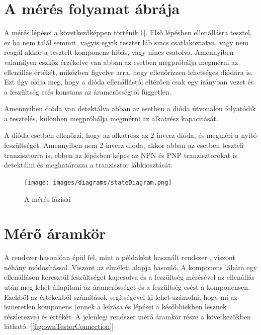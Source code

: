\section{A mérés folyamat ábrája}

A mérés lépései a következőképpen történik[\ref{fig:CalculateStateDiagram}].
Első lépésben ellenállásra tesztel, ez ha nem talál semmit,
vagyis egyik teszter láb sincs csatlakoztatva, vagy nem reagál akkor 
a tesztelt komponens hibás, vagy nincs csatolva. Amennyiben valamilyen 
eszköz érzékelve van abban az esetben megpróbálja megmérni az ellenállás 
értékét, miközben figyelve arra, hogy ellenőrizzen lehetséges diódára is.
Ezt úgy oldja meg, hogy a dióda ellenállástól eltérően csak egy irányban vezet és
a feszültség esés konstans az áramerősségtől független.

Amennyiben dióda van detektálva abban az esetben a dióda útvonalon folyatódik a
tesztelés, különben megpróbálja megmérni az alkatrész kapacitását.

A dióda esetben ellenőrzi, hogy az alkatrész az 2 inverz dióda, és 
megméri a nyitó feszültségét. Amennyiben nem 2 inverz dióda, akkor abban az esetben
teszteli tranzisztorra is, ebben az lépésben képes az NPN és PNP tranzisztorokat
is detektálni és meghatározza a tranzisztor lábkiosztását.

\begin{figure}[H]
    \centering
    \texttt{[image: images/diagrams/stateDiagram.png]}
    \caption{A mérés fázisai}
    \label{fig:CalculateStateDiagram}
\end{figure}


\section{Mérő áramkör}

A rendszer hasonlóan épül fel, mint a példaként használt rendszer \cite{similarSystem}, viszont néhány módosítással.
Viszont az elméleti alapja hasonló. A komponens lábára egy ellenálláson keresztül feszültséget kapcsolva és a 
feszültség mérésével az ellenállás után meg lehet állapítani az áramerősséget és a feszültség esést a komponensen.
Ezekből az értékekből számítások segítségével ki lehet számolni, hogy mi az ismeretlen komponens (ennek a leírása
és lépései a későbbiekben lesznek részletezve) és értékét. A jelenlegi rendszer mérő áramkör része a következőkben
látható. [\ref{fig:ownTesterConnection}]

